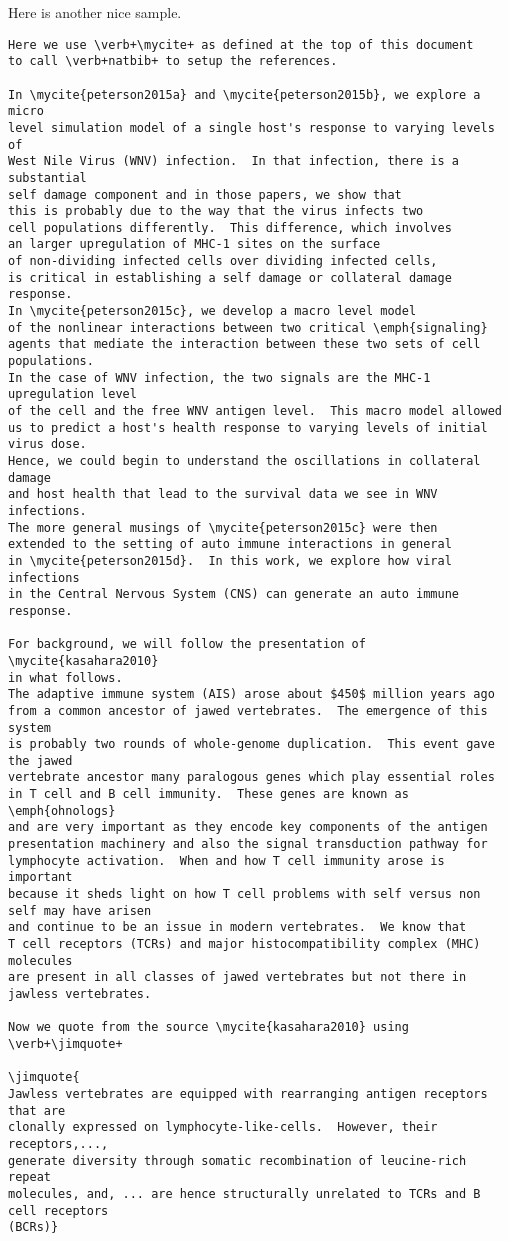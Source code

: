 \documentclass[11pt]{SelfArxOneColBMN}
\begin{document}
Here is another nice sample.

\begin{lstlisting}
Here we use \verb+\mycite+ as defined at the top of this document
to call \verb+natbib+ to setup the references.

In \mycite{peterson2015a} and \mycite{peterson2015b}, we explore a micro
level simulation model of a single host's response to varying levels of
West Nile Virus (WNV) infection.  In that infection, there is a substantial
self damage component and in those papers, we show that
this is probably due to the way that the virus infects two
cell populations differently.  This difference, which involves
an larger upregulation of MHC-1 sites on the surface
of non-dividing infected cells over dividing infected cells,
is critical in establishing a self damage or collateral damage response.
In \mycite{peterson2015c}, we develop a macro level model
of the nonlinear interactions between two critical \emph{signaling}
agents that mediate the interaction between these two sets of cell populations.
In the case of WNV infection, the two signals are the MHC-1 upregulation level
of the cell and the free WNV antigen level.  This macro model allowed
us to predict a host's health response to varying levels of initial virus dose.
Hence, we could begin to understand the oscillations in collateral damage
and host health that lead to the survival data we see in WNV infections.
The more general musings of \mycite{peterson2015c} were then 
extended to the setting of auto immune interactions in general
in \mycite{peterson2015d}.  In this work, we explore how viral infections
in the Central Nervous System (CNS) can generate an auto immune
response.

For background, we will follow the presentation of \mycite{kasahara2010}
in what follows.
The adaptive immune system (AIS) arose about $450$ million years ago
from a common ancestor of jawed vertebrates.  The emergence of this system
is probably two rounds of whole-genome duplication.  This event gave the jawed
vertebrate ancestor many paralogous genes which play essential roles
in T cell and B cell immunity.  These genes are known as \emph{ohnologs}
and are very important as they encode key components of the antigen
presentation machinery and also the signal transduction pathway for
lymphocyte activation.  When and how T cell immunity arose is important
because it sheds light on how T cell problems with self versus non self may have arisen
and continue to be an issue in modern vertebrates.  We know that
T cell receptors (TCRs) and major histocompatibility complex (MHC) molecules
are present in all classes of jawed vertebrates but not there in jawless vertebrates.

Now we quote from the source \mycite{kasahara2010} using \verb+\jimquote+

\jimquote{
Jawless vertebrates are equipped with rearranging antigen receptors that are
clonally expressed on lymphocyte-like-cells.  However, their receptors,...,
generate diversity through somatic recombination of leucine-rich repeat
molecules, and, ... are hence structurally unrelated to TCRs and B cell receptors
(BCRs)}
\end{lstlisting}
\end{document}
